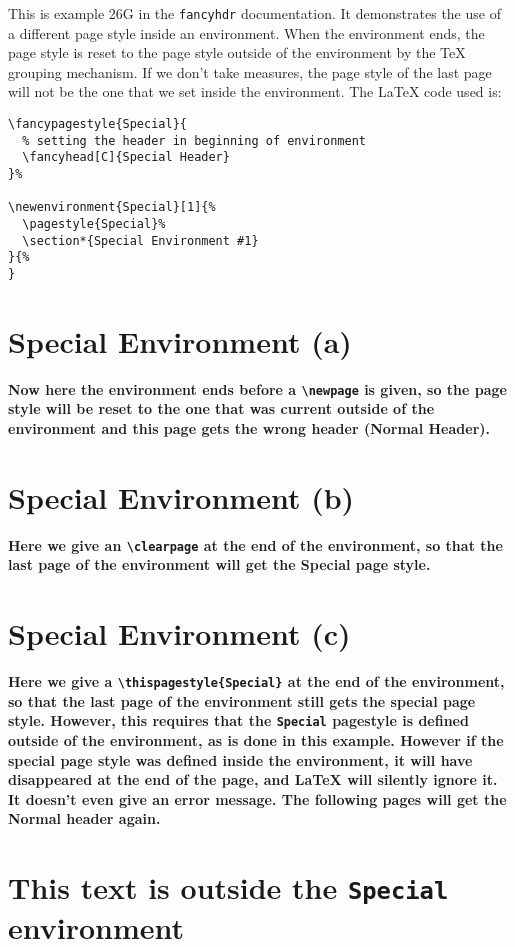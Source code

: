 \documentclass[a4paper]{article}
\newenvironment{Special}[1]{%
  \pagestyle{Special}%
  \section*{Special Environment (#1)}
}{%
}
\begin{document}
This is example 26G in the \texttt{fancyhdr} documentation. It 
demonstrates the use of a different page style inside an
environment. When the environment ends, the page style is reset to the
page style outside of the environment by the \TeX{} grouping mechanism.
If we don't take measures, the page style of the last page will not be
the one that we set inside the environment. The \LaTeX{} code used is:
\begin{verbatim}
\fancypagestyle{Special}{
  % setting the header in beginning of environment
  \fancyhead[C]{Special Header}
}%

\newenvironment{Special}[1]{%
  \pagestyle{Special}%
  \section*{Special Environment #1}
}{%
}
\end{verbatim}

\begin{Special}{a}

{\itshape\lipsum}

\bigskip

{\bfseries Now here the environment ends before a \verb|\newpage| is
  given, so the page style will be reset to the one that was current
  outside of the environment and this page gets the wrong header (Normal
  Header).}

\end{Special}

\clearpage

\begin{Special}{b}

{\itshape\lipsum}

\bigskip

{\bfseries Here we give an \verb|\clearpage| at the end of the
  environment, so that the last page of the environment will get the
  Special page style.}

\clearpage

\end{Special}

\begin{Special}{c}

{\itshape\lipsum}

\bigskip

{\bfseries Here we give a \verb|\thispagestyle{Special}| at the end of
  the environment, so that the last page of the environment still gets
  the special page style. However, this requires that the
  \texttt{Special} pagestyle is defined outside of the environment, as
  is done in this example. However if the special page style was defined
  inside the environment, it will have disappeared at the end of the
  page, and \LaTeX{} will silently ignore it. It doesn't even give an
  error message. The following pages will get the Normal header again.}

\thispagestyle{Special}

\end{Special}

\section*{This text is outside the \texttt{Special} environment}

\lipsum
\end{document}
